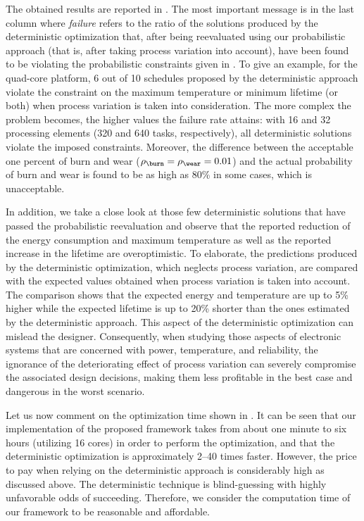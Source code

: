 The obtained results are reported in . The
most important message is in the last column where \emph{failure} refers to the
ratio of the solutions produced by the deterministic optimization that, after
being reevaluated using our probabilistic approach (that is, after taking
process variation into account), have been found to be violating the
probabilistic constraints given in . To
give an example, for the quad-core platform, 6 out of 10 schedules proposed by
the deterministic approach violate the constraint on the maximum temperature or
minimum lifetime (or both) when process variation is taken into consideration.
The more complex the problem becomes, the higher values the failure rate
attains: with 16 and 32 processing elements (320 and 640 tasks, respectively),
all deterministic solutions violate the imposed constraints. Moreover, the
difference between the acceptable one percent of burn and wear ($\rho_\burn =
\rho_\wear = 0.01$) and the actual probability of burn and wear is found to be
as high as 80\% in some cases, which is unacceptable.

In addition, we take a close look at those few deterministic solutions that have
passed the probabilistic reevaluation and observe that the reported reduction of
the energy consumption and maximum temperature as well as the reported increase
in the lifetime are overoptimistic. To elaborate, the predictions produced by
the deterministic optimization, which neglects process variation, are compared
with the expected values obtained when process variation is taken into account.
The comparison shows that the expected energy and temperature are up to 5\%
higher while the expected lifetime is up to 20\% shorter than the ones estimated
by the deterministic approach. This aspect of the deterministic optimization can
mislead the designer. Consequently, when studying those aspects of electronic
systems that are concerned with power, temperature, and reliability, the
ignorance of the deteriorating effect of process variation can severely
compromise the associated design decisions, making them less profitable in the
best case and dangerous in the worst scenario.

Let us now comment on the optimization time shown in
. It can be seen that our implementation of
the proposed framework takes from about one minute to six hours (utilizing 16
cores) in order to perform the optimization, and that the deterministic
optimization is approximately 2--40 times faster. However, the price to pay when
relying on the deterministic approach is considerably high as discussed above.
The deterministic technique is blind-guessing with highly unfavorable odds of
succeeding. Therefore, we consider the computation time of our framework to be
reasonable and affordable.

